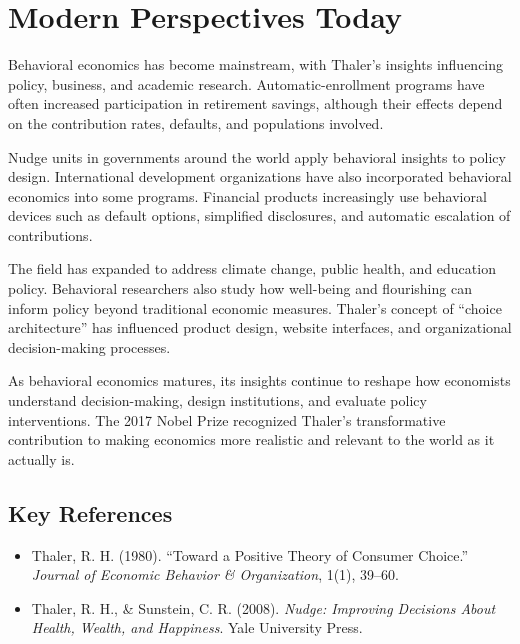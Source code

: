 \section{Modern Perspectives Today}
Behavioral economics has become mainstream, with Thaler's insights influencing
policy, business, and academic research. Automatic-enrollment programs have often
increased participation in retirement savings, although their effects depend on
the contribution rates, defaults, and populations involved.

Nudge units in governments around the world apply behavioral insights to policy
design. International development organizations have also incorporated behavioral
economics into some programs. Financial products increasingly use behavioral
devices such as default options, simplified disclosures, and automatic escalation
of contributions.

The field has expanded to address climate change, public health, and education
policy. Behavioral researchers also study how well-being and flourishing can
inform policy beyond traditional economic measures. Thaler's concept of ``choice
architecture'' has influenced product design, website interfaces, and
organizational decision-making processes.

As behavioral economics matures, its insights continue to reshape how economists
understand decision-making, design institutions, and evaluate policy interventions.
The 2017 Nobel Prize recognized Thaler's transformative contribution to making
economics more realistic and relevant to the world as it actually is.

\subsection*{Key References}
\begin{itemize}
    \item Thaler, R. H. (1980). ``Toward a Positive Theory of Consumer Choice.'' \textit{Journal of Economic Behavior \& Organization}, 1(1), 39--60.
    \item Thaler, R. H., \& Sunstein, C. R. (2008). \textit{Nudge: Improving Decisions About Health, Wealth, and Happiness}. Yale University Press.
\end{itemize}
